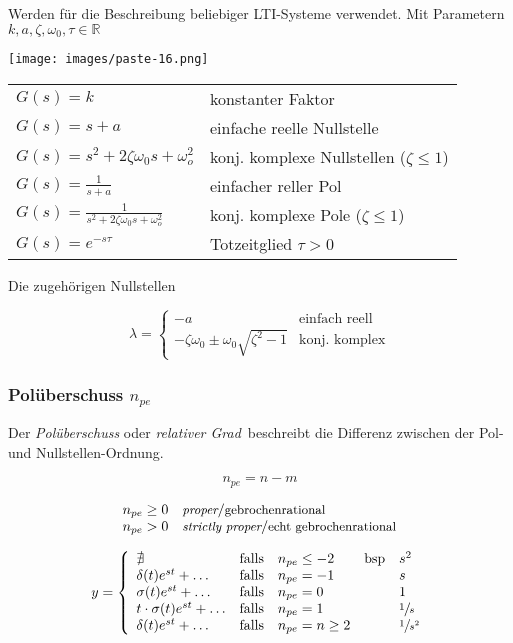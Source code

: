 \documentclass[
  10pt,
  a4paper,
  twocolumn]{article}
\makeatletter
\numberwithin{equation}{section}
\newenvironment{conditions}
  {\par\vspace{\abovedisplayskip}\noindent\begin{tabular}{>{$}l<{$} @{${}:{}$} l}}
  {\end{tabular}\par\vspace{\belowdisplayskip}}
\makeatother
\begin{document}
Werden für die Beschreibung beliebiger LTI-Systeme verwendet. Mit
Parametern \(k,a,\zeta,\omega_0,\tau \in \mathbb{R}\)

\texttt{[image: images/paste-16.png]}

\begin{conditions}
  G(s)=k                                         & konstanter Faktor \\
  G(s)=s + a                                     & einfache reelle Nullstelle \\
  G(s)=s^2+2\zeta\omega_0 s+\omega_o^2           & konj. komplexe Nullstellen ($\zeta \leq 1$) \\
  G(s)=\frac{1}{s+a}                             & einfacher reller Pol \\
  G(s)=\frac{1}{s^2+2\zeta\omega_0 s+\omega_o^2} & konj. komplexe Pole ($\zeta\leq 1$) \\
  G(s)=e^{-s\tau}                                & Totzeitglied $\tau > 0$ \\
\end{conditions}

Die zugehörigen Nullstellen

\[
\lambda = \left\{ \begin{array}{cl}
-a & \text{einfach reell} \\
-\zeta\omega_0 \pm \omega_0 \sqrt{\zeta^2-1} & \text{konj. komplex}
\end{array}\right.
\]

\subsubsection{\texorpdfstring{Polüberschuss
\(n_{pe}\)}{Polüberschuss n\_\{pe\}}}\label{poluxfcberschuss-n_pe}

Der \emph{Polüberschuss} oder \emph{relativer Grad}~beschreibt die
Differenz zwischen der Pol- und Nullstellen-Ordnung.

\[
n_{pe} = n - m
\]

\[
\begin{array}{ll}
n_{pe} \geq 0 & \small{\textit{proper}/\text{gebrochenrational}} \\
n_{pe}  >   0 & \small{\textit{strictly proper}/\text{echt gebrochenrational}} \\
\end{array}
\]

\[
y=\left\{
\begin{array}{lclcl}
\nexists & \text{falls} & n_{pe} \leq -2 & \text{bsp} & s^2 \\
\delta(t)e^{st}+\ldots & \text{falls} & n_{pe} = -1 &  & s \\
\sigma(t)e^{st}+\ldots & \text{falls} & n_{pe} = 0 &  & 1 \\
t\cdot\sigma(t)e^{st}+\ldots & \text{falls} & n_{pe} = 1 &  & \sfrac{1}{s} \\
\delta(t)e^{st}+\ldots & \text{falls} & n_{pe} = n \geq 2 &  &  \sfrac{1}{s^2}
\end{array}
\right.
\]
\end{document}
